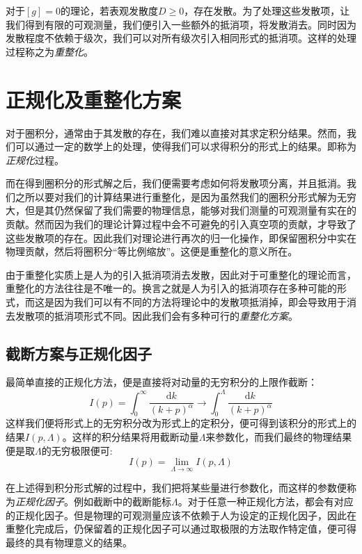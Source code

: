 对于$[g]=0$的理论，若表观发散度$D\geqslant0$，存在发散。为了处理这些发散项，让我们得到有限的可观测量，我们便引入一些额外的抵消项，将发散消去。同时因为发散程度不依赖于级次，我们可以对所有级次引入相同形式的抵消项。这样的处理过程称之为\emph{重整化}。
\section{正规化及重整化方案}
对于圈积分，通常由于其发散的存在，我们难以直接对其求定积分结果。然而，我们可以通过一定的数学上的处理，使得我们可以求得积分的形式上的结果。即称为\emph{正规化}过程。

而在得到圈积分的形式解之后，我们便需要考虑如何将发散项分离，并且抵消。我们之所以要对我们的计算结果进行重整化，是因为虽然我们的圈积分形式解为无穷大，但是其仍然保留了我们需要的物理信息，能够对我们测量的可观测量有实在的贡献。然而因为我们的理论计算过程中会不可避免的引入真空项的贡献，才导致了这些发散项的存在。因此我们对理论进行再次的归一化操作，即保留圈积分中实在物理贡献，然后将圈积分“等比例缩放”。这便是重整化的意义所在。

由于重整化实质上是人为的引入抵消项消去发散，因此对于可重整化的理论而言，重整化的方法往往是不唯一的。换言之就是人为引入的抵消项存在多种可能的形式，而这是因为我们可以有不同的方法将理论中的发散项抵消掉，即会导致用于消去发散项的抵消项形式不同。因此我们会有多种可行的\emph{重整化方案}。
\subsection*{截断方案与正规化因子}
最简单直接的正规化方法，便是直接将对动量的无穷积分的上限作截断：
\begin{equation}
I(p)=\int_0^\infty\frac{\mathrm{d}k}{(k+p)^\alpha}\rightarrow\int_0^\Lambda\frac{\mathrm{d}k}{(k+p)^\alpha}
\end{equation}
这样我们便将形式上的无穷积分改为形式上的定积分，便可得到该积分的形式上的结果$I(p,\Lambda)$。这样的积分结果将用截断动量$\Lambda$来参数化，而我们最终的物理结果便是取$\Lambda$的无穷极限便可:
\begin{equation}
I(p)=\lim_{\Lambda\rightarrow\infty}I(p,\Lambda)
\end{equation}

在上述得到积分形式解的过程中，我们把将某些量进行参数化，而这样的参数便称为\emph{正规化因子}。例如截断中的截断能标$\Lambda$。对于任意一种正规化方法，都会有对应的正规化因子。但是物理的可观测量应该不依赖于人为设定的正规化因子，因此在重整化完成后，仍保留着的正规化因子可以通过取极限的方法取作特定值，便可得最终的具有物理意义的结果。

